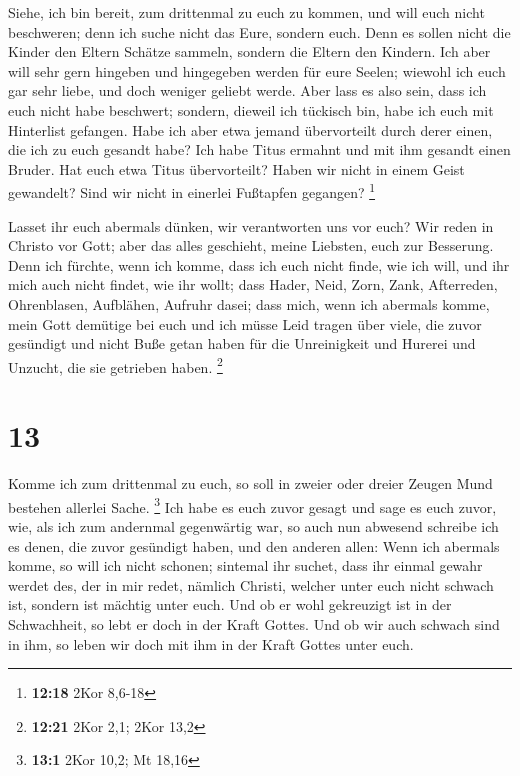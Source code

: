  Siehe, ich bin bereit, zum drittenmal zu euch zu kommen,
und will euch nicht beschweren; denn ich suche nicht das Eure, sondern
euch. Denn es sollen nicht die Kinder den Eltern Schätze sammeln,
sondern die Eltern den Kindern.  Ich aber will sehr gern
hingeben und hingegeben werden für eure Seelen; wiewohl ich euch gar
sehr liebe, und doch weniger geliebt werde.  Aber lass es
also sein, dass ich euch nicht habe beschwert; sondern, dieweil ich
tückisch bin, habe ich euch mit Hinterlist gefangen.  Habe
ich aber etwa jemand übervorteilt durch derer einen, die ich zu euch
gesandt habe?  Ich habe Titus ermahnt und mit ihm gesandt
einen Bruder. Hat euch etwa Titus übervorteilt? Haben wir nicht in einem
Geist gewandelt? Sind wir nicht in einerlei Fußtapfen gegangen?
\footnote{\textbf{12:18} 2Kor 8,6-18}

 Lasset ihr euch abermals dünken, wir verantworten uns vor
euch? Wir reden in Christo vor Gott; aber das alles geschieht, meine
Liebsten, euch zur Besserung.  Denn ich fürchte, wenn ich
komme, dass ich euch nicht finde, wie ich will, und ihr mich auch nicht
findet, wie ihr wollt; dass Hader, Neid, Zorn, Zank, Afterreden,
Ohrenblasen, Aufblähen, Aufruhr dasei;  dass mich, wenn ich
abermals komme, mein Gott demütige bei euch und ich müsse Leid tragen
über viele, die zuvor gesündigt und nicht Buße getan haben für die
Unreinigkeit und Hurerei und Unzucht, die sie getrieben haben.
\footnote{\textbf{12:21} 2Kor 2,1; 2Kor 13,2}

\hypertarget{section-7}{%
\section{13}\label{section-7}}

 Komme ich zum drittenmal zu euch, so soll in zweier oder
dreier Zeugen Mund bestehen allerlei Sache. \footnote{\textbf{13:1} 2Kor
  10,2; Mt 18,16}  Ich habe es euch zuvor gesagt und sage es
euch zuvor, wie, als ich zum andernmal gegenwärtig war, so auch nun
abwesend schreibe ich es denen, die zuvor gesündigt haben, und den
anderen allen: Wenn ich abermals komme, so will ich nicht schonen;
 sintemal ihr suchet, dass ihr einmal gewahr werdet des, der
in mir redet, nämlich Christi, welcher unter euch nicht schwach ist,
sondern ist mächtig unter euch.  Und ob er wohl gekreuzigt
ist in der Schwachheit, so lebt er doch in der Kraft Gottes. Und ob wir
auch schwach sind in ihm, so leben wir doch mit ihm in der Kraft Gottes
unter euch.

